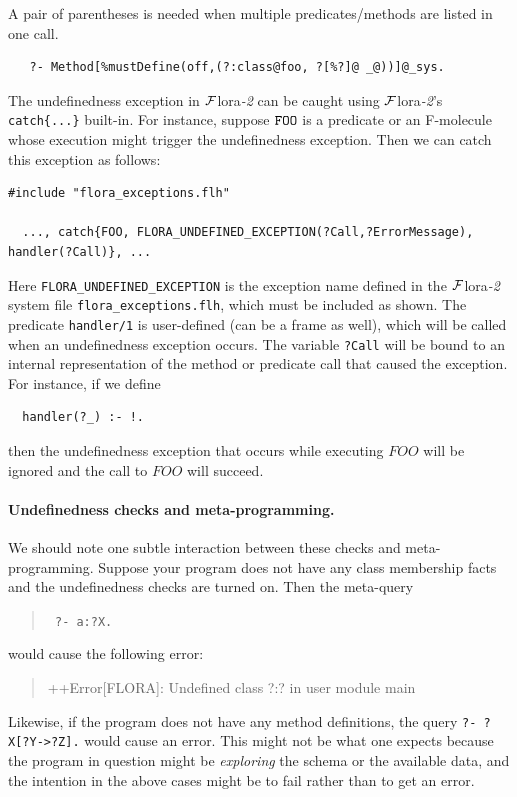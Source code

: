 \documentclass[11pt]{article}
\newcommand{\FLORA}{{\mbox{\sc ${\cal F}${lora}\rm\emph{-2}}}\xspace}
\begin{document}
A pair of parentheses is needed when multiple
predicates/methods are listed in one call.
\begin{verbatim}
   ?- Method[%mustDefine(off,(?:class@foo, ?[%?]@ _@))]@_sys.
\end{verbatim}

The undefinedness exception in \FLORA can be caught using \FLORA's {\tt
  catch\{...\}} built-in. For instance, suppose
$\tt FOO$ is a predicate or an F-molecule whose execution might trigger the
undefinedness exception. Then we can catch this exception as follows:
\begin{verbatim}
#include "flora_exceptions.flh"

  ..., catch{FOO, FLORA_UNDEFINED_EXCEPTION(?Call,?ErrorMessage), handler(?Call)}, ...
\end{verbatim}
Here {\tt FLORA\_UNDEFINED\_EXCEPTION} is the exception name defined in the
\FLORA system file {\tt flora\_exceptions.flh}, which must be included as
shown.
The predicate {\tt handler/1} is user-defined (can be a frame as well),
which will be called when an undefinedness exception occurs. The variable
{\tt ?Call} will be bound to an internal representation of the method or
predicate call that caused the exception. For instance, if we define
\begin{verbatim}
  handler(?_) :- !.  
\end{verbatim}
then the undefinedness exception that occurs while executing $FOO$ will be
ignored and the call to $FOO$ will succeed.


\paragraph{Undefinedness checks and meta-programming.}
We should note one subtle interaction between these checks and
meta-programming. Suppose your program does not have any class membership
facts and the undefinedness checks are turned on. Then the meta-query
\begin{quote}
 {\tt
       ?- a:?X.
 }
\end{quote}
would cause the following error:
\begin{quote}
 ++Error[FLORA]: Undefined class ?:? in user module main  
\end{quote}
Likewise, if the program does not have any method definitions,
the query {\tt ?- ?X[?Y->?Z].} would cause an error. This might not
be what one expects because the program in question might be
\emph{exploring} the schema or the available data, and the intention in the
above cases might be to fail rather than to get an error.
\end{document}
